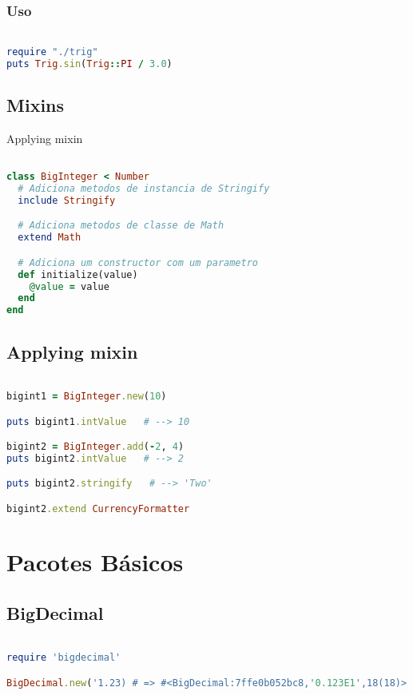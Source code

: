 \documentclass[serif,mathserif]{book}
\begin{document}
\subsection{Uso}

\begin{lstlisting}[language=ruby]

require "./trig"
puts Trig.sin(Trig::PI / 3.0)
\end{lstlisting}

\section{Mixins}

Applying mixin

\begin{lstlisting}[language=ruby]

class BigInteger < Number
  # Adiciona metodos de instancia de Stringify
  include Stringify

  # Adiciona metodos de classe de Math
  extend Math

  # Adiciona um constructor com um parametro
  def initialize(value)
    @value = value
  end
end
\end{lstlisting}

\section{Applying mixin}

\begin{lstlisting}[language=ruby]

bigint1 = BigInteger.new(10)

puts bigint1.intValue   # --> 10

bigint2 = BigInteger.add(-2, 4)
puts bigint2.intValue   # --> 2

puts bigint2.stringify   # --> 'Two'

bigint2.extend CurrencyFormatter
\end{lstlisting}

\chapter{Pacotes Básicos}

\section{BigDecimal}

\begin{lstlisting}[language=ruby]

require 'bigdecimal'

BigDecimal.new('1.23) # => #<BigDecimal:7ffe0b052bc8,'0.123E1',18(18)>
\end{lstlisting}
\end{document}
